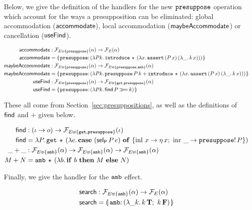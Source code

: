 Below, we give the definition of the handlers for the new $\mathtt{presuppose}$
operation which account for the ways a presupposition can be eliminated:
global accommodation ($\mathsf{accommodate}$), local accommodation
($\mathsf{maybeAccommodate}$) or cancellation ($\mathsf{useFind}$).

\begin{align*}
  \accommodate &: \FF_{E \uplus \{\op{presuppose}\}}(\alpha) \to \FF_E(\alpha) \\
  \accommodate &= \banana{\onto{\op{presuppose}}{(\lam{P k}{
    \app{\op{introduce}}{\star}{(\lam{x}{\app{\op{assert}}{(\ap{P}{x})}{(\lam{\_}{\ap{k}{x}})}})}})}} \\
  \maybeAccommodate &: \FF_{E \uplus \{\op{presuppose}\}}(\alpha) \to
                      \FF_{E \uplus \{\op{presuppose},\op{amb}\}}(\alpha) \\
  \maybeAccommodate &= \banana{\onto{\op{presuppose}}{(\lam{P k}{
    \app{\op{presuppose}}{P}{k} +
    \app{\op{introduce}}{\star}{(\lam{x}{\app{\op{assert}}{(\ap{P}{x})}{(\lam{\_}{\ap{k}{x}})}})}})}} \\
  \useFind &: \FF_{E \uplus \{\op{presuppose}\}}(\alpha) \to \FF_{E \uplus \{\op{get}, \op{presuppose}\}}(\alpha) \\
  \useFind &= \banana{\onto{\op{presuppose}}{(\lam{P k}{\ap{\find}{P} \hsbind k})}}
\end{align*}

These all come from Section~\ref{sec:presuppositions}, as well as the
definitions of $\mathsf{find}$ and $+$ given below.

\begin{align*}
  \mathsf{find} &: (\iota \to o) \to \mathcal{F}_{E \uplus \{\mathtt{get}, \mathtt{presuppose}\}}(\iota) \\
  \mathsf{find} &= \lambda P.\, \mathtt{get}\,\star\,(\lambda e.\, \text{\textbf{case} $(\mathsf{sel}_{\mathsf{P}}\,P\,e)$ \textbf{of} $\{ \operatorname{inl}\,x \to \eta\,x;\ \operatorname{inr}\,\_ \to \mathtt{presuppose}!\,P \}$}) \\
  \_+\_ &: \mathcal{F}_{E \uplus \{\mathtt{amb}\}}(\alpha) \to \mathcal{F}_{E \uplus \{\mathtt{amb}\}}(\alpha) \to \mathcal{F}_{E \uplus \{\mathtt{amb}\}}(\alpha) \\
  M + N &= \mathtt{amb}\,\star\,(\lambda b.\, \text{\textbf{if} $b$ \textbf{then} $M$ \textbf{else} $N$})
\end{align*}

Finally, we give the handler for the $\mathtt{amb}$ effect.

\begin{align*}
  \search &: \FF_{E \uplus \{\op{amb}\}}(\alpha) \to \FF_E(\alpha) \\
  \search &= \banana{\onto{\op{amb}}{(\lam{\_ k}{\ap{k}{\true};\ \ap{k}{\false}})}}
\end{align*}

